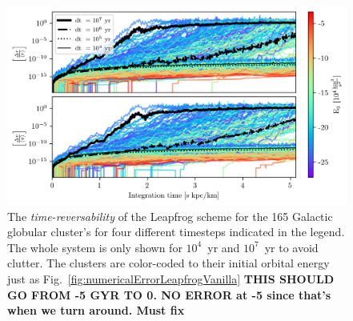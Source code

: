         \begin{figure}
            \centering
            \includegraphics[width=\linewidth]{images/numericalErrorReverseIntegration.png}
            \caption[Time-reversability of the globular cluster system]{The \textit{time-reversability} of the Leapfrog scheme for the 165 Galactic globular cluster's for four different timesteps indicated in the legend. The whole system is only shown for $10^4$~yr and $10^7$~yr to avoid clutter. The clusters are color-coded to their initial orbital energy just as Fig.~\ref{fig:numericalErrorLeapfrogVanilla} \textbf{THIS SHOULD GO FROM -5 GYR TO 0. NO ERROR at -5 since that's when we turn around. Must fix }}
            \label{fig:numericalErrorReverseIntegration}
        \end{figure}

